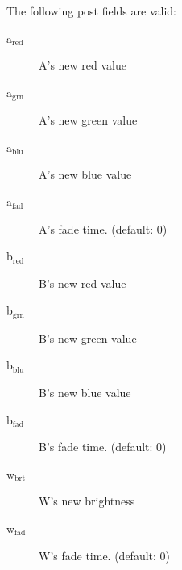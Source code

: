 \documentclass[11pt]{article}
\begin{document}
The following post fields are valid: 
\begin{description}
\item[{a$_{\text{red}}$}] A's new red value
\item[{a$_{\text{grn}}$}] A's new green value
\item[{a$_{\text{blu}}$}] A's new blue value
\item[{a$_{\text{fad}}$}] A's fade time. (default: 0)

\item[{b$_{\text{red}}$}] B's new red value
\item[{b$_{\text{grn}}$}] B's new green value
\item[{b$_{\text{blu}}$}] B's new blue value
\item[{b$_{\text{fad}}$}] B's fade time. (default: 0)

\item[{w$_{\text{brt}}$}] W's new brightness
\item[{w$_{\text{fad}}$}] W's fade time. (default: 0)
\end{description}
\end{document}
